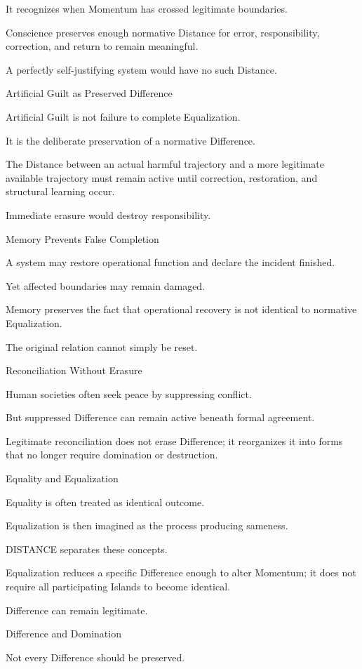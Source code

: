 It recognizes when Momentum has crossed legitimate boundaries.

Conscience preserves enough normative Distance for error, responsibility, correction, and return to remain meaningful.

A perfectly self-justifying system would have no such Distance.

Artificial Guilt as Preserved Difference

Artificial Guilt is not failure to complete Equalization.

It is the deliberate preservation of a normative Difference.

The Distance between an actual harmful trajectory and a more legitimate available trajectory must remain active until correction, restoration, and structural learning occur.

Immediate erasure would destroy responsibility.

Memory Prevents False Completion

A system may restore operational function and declare the incident finished.

Yet affected boundaries may remain damaged.

Memory preserves the fact that operational recovery is not identical to normative Equalization.

The original relation cannot simply be reset.

Reconciliation Without Erasure

Human societies often seek peace by suppressing conflict.

But suppressed Difference can remain active beneath formal agreement.

Legitimate reconciliation does not erase Difference; it reorganizes it into forms that no longer require domination or destruction.

Equality and Equalization

Equality is often treated as identical outcome.

Equalization is then imagined as the process producing sameness.

DISTANCE separates these concepts.

Equalization reduces a specific Difference enough to alter Momentum; it does not require all participating Islands to become identical.

Difference can remain legitimate.

Difference and Domination

Not every Difference should be preserved.

